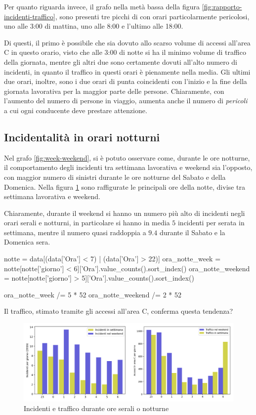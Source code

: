 \documentclass[a4paper,12pt]{report}
\newcommand{\quotestyle}[1]{\textit{#1}}
\begin{document}
Per quanto riguarda invece, il grafo nella metà bassa della 
figura \ref{fig:rapporto-incidenti-traffico}, sono presenti tre picchi di 
con orari particolarmente pericolosi, uno alle 3:00 di mattina, uno alle 
8:00 e l'ultimo alle 18:00. 

Di questi, il primo è possibile che sia dovuto allo scarso volume di accessi 
all'area C in questo orario, visto che alle 3:00 di notte si ha il minimo volume di 
traffico della giornata, mentre gli altri due sono certamente dovuti all'alto 
numero di incidenti, in quanto il traffico in questi orari è pienamente nella media.
Gli ultimi due orari, inoltre, sono i due orari di punta coincidenti con l'inizio 
e la fine della giornata lavorativa per la maggior parte delle persone. 
Chiaramente, con l'aumento del numero di persone in viaggio, aumenta anche il 
numero di \quotestyle{pericoli} a cui ogni conducente deve prestare attenzione.

\subsection{Incidentalità in orari notturni}

Nel grafo \ref{fig:week-weekend}, si è potuto osservare come, durante le 
ore notturne, il comportamento degli incidenti tra settimana lavorativa e weekend 
sia l'opposto, con maggior numero di sinistri durante le ore notturne del 
Sabato e della Domenica.
Nella figura \ref{fig:ore-notte} sono raffigurate le principali ore della notte, divise tra 
settimana lavorativa e weekend.

Chiaramente, durante il weekend si hanno un numero più alto di incidenti negli orari serali e 
notturni, in particolare si hanno in media $5$ incidenti per serata in settimana, mentre il numero 
quasi raddoppia a $9.4$ durante il Sabato e la Domenica sera.

\begin{code}
notte = data[(data['Ora'] < 7) | (data['Ora'] > 22)]
ora_notte_week = notte[notte['giorno'] < 6]['Ora'].value_counts().sort_index()
ora_notte_weekend = notte[notte['giorno'] > 5]['Ora'].value_counts().sort_index()

ora_notte_week /= 5 * 52  
ora_notte_weekend /= 2 * 52
\end{code}

Il traffico, stimato tramite gli accessi all'area C, conferma questa tendenza?
\begin{figure}
    \includegraphics[width=\linewidth]{img_unite/ore_punta.png}
    \caption{Incidenti e traffico durante ore serali o notturne}
    \label{fig:ore-notte}
\end{figure}
\end{document}
